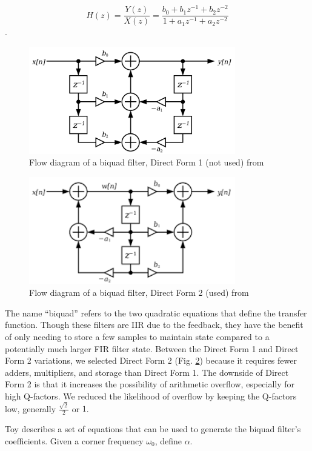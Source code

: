 \documentclass[conference]{IEEEtran}
\begin{document}
$$H(z) = \frac{Y(z)}{X(z)} = \frac{b_0 + b_1 z^{-1} + b_2 z^{-2}}{1 + a_1 z^{-1} + a_2 z^{-2}}$$.

\begin{figure}[htbp]
    \centerline{\includegraphics[width=9cm]{biquad1.png}}
    \caption{Flow diagram of a biquad filter, Direct Form 1 (not used) from \cite{biquad_img1}} 
    \label{fig:biquad1}
\end{figure}

\begin{figure}[htbp]
    \centerline{\includegraphics[width=9cm]{biquad2.png}}
    \caption{Flow diagram of a biquad filter, Direct Form 2 (used) from\cite{biquad_img2}}
    \label{fig:biquad2}
\end{figure}

The name ``biquad'' refers to the two quadratic equations that define the transfer function. Though these filters are IIR due to the feedback, they have the benefit of only needing to store a few samples to maintain state compared to a potentially much larger FIR filter state. Between the Direct Form 1 and Direct Form 2 variations, we selected Direct Form 2 (Fig. \ref{fig:biquad2}) because it requires fewer adders, multipliers, and storage than Direct Form 1. The downside of Direct Form 2 is that it increases the possibility of arithmetic overflow, especially for high Q-factors. We reduced the likelihood of overflow by keeping the Q-factors low, generally $\frac{\sqrt{2}}{2}$ or $1$.

Toy \cite{eq_cookbook} describes a set of equations that can be used to generate the biquad filter's coefficients. Given a corner frequency $\omega_0$, define $\alpha$.
\end{document}
